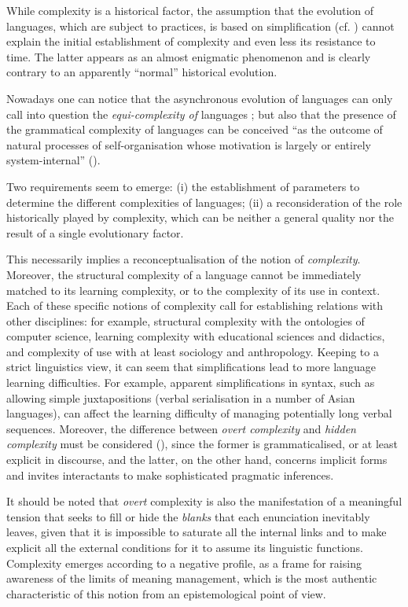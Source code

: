 \documentclass[output=paper]{langscibook}
\begin{document}
While complexity is a historical factor, the assumption that the evolution of languages, which are subject to practices, is based on simplification (cf. \citealt{Culicover2013}) cannot explain the initial establishment of complexity and even less its resistance to time. The latter appears as an almost enigmatic phenomenon and is clearly contrary to an apparently “normal” historical evolution. 

Nowadays one can notice that the asynchronous evolution of languages can only call into question the \textit{equi-complexity of} languages \citep[9]{HadermannEtAl2017}; but also that the presence of the grammatical complexity of languages can be conceived “as the outcome of natural processes of self-organisation whose motivation is largely or entirely system-internal” (\citealt[33]{Gil2009}). 

Two requirements seem to emerge: (i) the establishment of parameters to determine the different complexities of languages; (ii) a reconsideration of the role historically played by complexity, which can be neither a general quality nor the result of a single evolutionary factor.

\begin{sloppypar}
This necessarily implies a reconceptualisation of the notion of \textit{complexity}. Moreover, the structural complexity of a language cannot be immediately matched to its learning complexity, or to the complexity of its use in context. Each of these specific notions of complexity call for establishing relations with other disciplines: for example, structural complexity with the ontologies of computer science, learning complexity with educational sciences and didactics, and complexity of use with at least sociology and anthropology. Keeping to a strict linguistics view, it can seem that simplifications lead to more language learning difficulties. For example, apparent simplifications in syntax, such as allowing simple juxtapositions (verbal serialisation in a number of Asian languages), can affect the learning difficulty of managing potentially long verbal sequences. Moreover, the difference between \textit{overt complexity} and \textit{hidden complexity} must be considered (\citealt[48]{Bisang2009}), since the former is grammaticalised, or at least explicit in discourse, and the latter, on the other hand, concerns implicit forms and invites interactants to make sophisticated pragmatic inferences.\end{sloppypar}

It should be noted that \textit{overt} complexity is also the manifestation of a meaningful tension that seeks to fill or hide the \textit{blanks} that each enunciation inevitably leaves, given that it is impossible to saturate all the internal links and to make explicit all the external conditions for it to assume its linguistic functions. Complexity emerges according to a negative profile, as a frame for raising awareness of the limits of meaning management, which is the most authentic characteristic of this notion from an epistemological point of view.\largerpage
\end{document}
